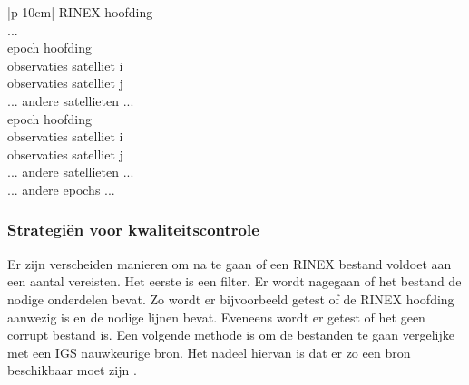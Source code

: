 \newcommand*{\MyIndent}{\hspace*{0.5cm}}%
 \begin{table}[hbp]
 	\caption{Vereenvoudigde samenstelling van een RINEX bestand}		
 	\begin{tabular}{|p {10cm}|}	
 		\hline
 		RINEX hoofding \\
 		... \\ \hline
 		epoch hoofding\\ \hline
 		\MyIndent observaties satelliet i \\ \hline
 		\MyIndent observaties satelliet j \\ \hline
 		... andere satellieten ... \\ \hline
 		epoch hoofding\\ \hline
 		\MyIndent observaties satelliet i \\ \hline
 		\MyIndent observaties satelliet j \\ \hline
 		... andere satellieten ... \\ \hline
 		... andere epochs ... \\ \hline	
 	\end{tabular}
 	\label{TabRTCMBer}
 \end{table}
 
 
\subsubsection{Strategi\"en voor kwaliteitscontrole}
Er zijn verscheiden manieren om na te gaan of een RINEX bestand voldoet aan een aantal vereisten. Het eerste is een filter. Er wordt nagegaan of het bestand de nodige onderdelen bevat. Zo wordt er bijvoorbeeld getest of de RINEX hoofding aanwezig is en de nodige lijnen bevat. Eveneens wordt er getest of het geen corrupt bestand is. Een volgende methode is om de bestanden te gaan vergelijke met een IGS nauwkeurige bron. Het nadeel hiervan is dat er zo een bron beschikbaar moet zijn \cite{LBibRINEX3}. 

